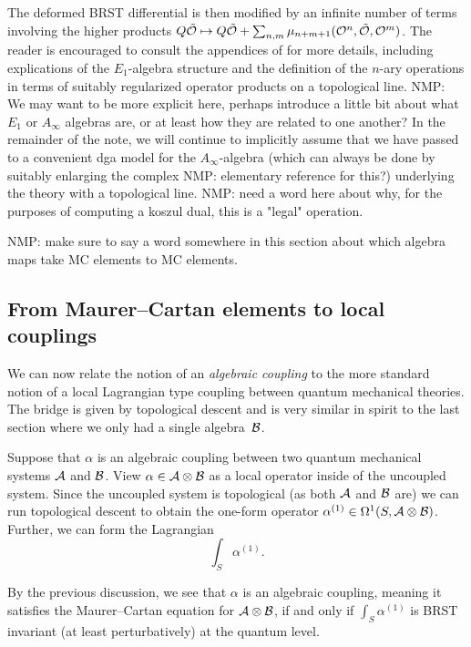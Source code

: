\documentclass[11pt]{amsart}
\def\natalie#1{{\textcolor{green!65!black}{NMP: {#1}}}}
\begin{document}
The deformed BRST differential is then modified by an infinite number of terms involving the higher products $Q \tilde{\mathcal O} \mapsto Q \tilde{\mathcal O} + \sum_{n, m}\mu_{n + m + 1}(\mathcal O^n, \tilde{\mathcal O}, \mathcal O^m)$. The reader is encouraged to consult the appendices of \cite{GO} for more details, including explications of the $E_1$-algebra structure and the definition of the $n$-ary operations in terms of suitably regularized operator products on a topological line. \natalie{We may want to be more explicit here, perhaps introduce a little bit about what $E_1$ or $A_{\infty}$ algebras are, or at least how they are related to one another?} In the remainder of the note, we will continue to implicitly assume that we have passed to a convenient dga model for the $A_{\infty}$-algebra (which can always be done by suitably enlarging the complex \natalie{elementary reference for this?}) underlying the theory with a topological line. \natalie{need a word here about why, for the purposes of computing a koszul dual, this is a "legal" operation.}

\natalie{make sure to say a word somewhere in this section about which algebra maps take MC elements to MC elements.}


\subsection{From Maurer--Cartan elements to local couplings} 

We can now relate the notion of an {\em algebraic coupling} to the more standard notion of a local Lagrangian type coupling between quantum mechanical theories. 
The bridge is given by topological descent and is very similar in spirit to the last section where we only had a single algebra~$\mathcal B$. 

Suppose that $\alpha$ is an algebraic coupling between two quantum mechanical systems $\mathcal A$ and $\mathcal B$. 
View $\alpha \in \mathcal A \otimes \mathcal B$ as a local operator inside of the uncoupled system. 
Since the uncoupled system is topological (as both $\mathcal A$ and $\mathcal B$ are) we can run topological descent to obtain the one-form operator $\alpha^{(1)} \in \Omega^1 (S , \mathcal A \otimes \mathcal B)$.
Further, we can form the Lagrangian 
\[
 \int_S \alpha^{(1)} .\]

By the previous discussion, we see that $\alpha$ is an algebraic coupling, meaning it satisfies the Maurer--Cartan equation for $\mathcal A \otimes \mathcal B$, if and only if $\int_S \alpha^{(1)}$ is BRST invariant (at least perturbatively) at the quantum level.
\end{document}
